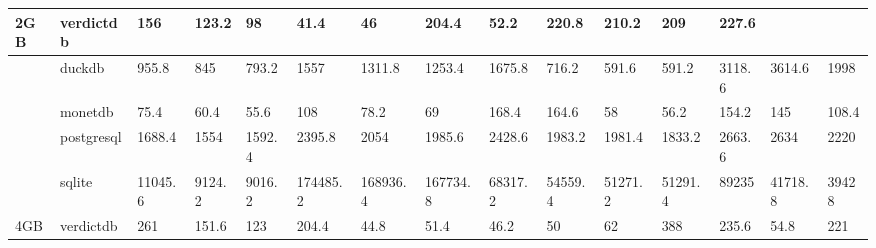 \begin{table}[]
\begin{tabular}{ll|lllllllllllll}
\multirow{-5}{*}{2GB} & verdictdb  & 156                         & 123.2                       & {\color[HTML]{009901} 98}   & {\color[HTML]{009901} 41.4} & {\color[HTML]{009901} 46}   & 204.4                       & {\color[HTML]{009901} 52.2} & 220.8                        & 210.2                       & 209                         & 227.6                       & \cellcolor[HTML]{FFFFFF}{\color[HTML]{009901} 50.8} & \cellcolor[HTML]{FFFFFF}{\color[HTML]{009901} 66.2} \\ \hline
                      & duckdb     & 955.8                       & 845                         & 793.2                       & 1557                        & 1311.8                      & 1253.4                      & 1675.8                      & 716.2                        & 591.6                       & 591.2                       & 3118.6                      & 3614.6                                              & 1998                                                \\
                      & monetdb    & {\color[HTML]{009901} 75.4} & {\color[HTML]{009901} 60.4} & {\color[HTML]{009901} 55.6} & 108                         & {\color[HTML]{009901} 78.2} & {\color[HTML]{009901} 69}   & 168.4                       & 164.6                        & {\color[HTML]{009901} 58}   & {\color[HTML]{009901} 56.2} & 154.2                       & 145                                                 & 108.4                                               \\
                      & postgresql & 1688.4                      & 1554                        & 1592.4                      & 2395.8                      & 2054                        & 1985.6                      & 2428.6                      & 1983.2                       & 1981.4                      & 1833.2                      & 2663.6                      & 2634                                                & 2220                                                \\
                      & sqlite     & 11045.6                     & 9124.2                      & 9016.2                      & 174485.2                    & 168936.4                    & 167734.8                    & 68317.2                     & 54559.4                      & 51271.2                     & 51291.4                     & 89235                       & 41718.8                                             & 39428                                               \\
\multirow{-5}{*}{4GB} & verdictdb  & 261                         & 151.6                       & 123                         & 204.4                       & {\color[HTML]{009901} 44.8} & {\color[HTML]{009901} 51.4} & {\color[HTML]{009901} 46.2} & {\color[HTML]{009901} 50}    & {\color[HTML]{009901} 62}   & 388                         & 235.6                       & {\color[HTML]{009901} 54.8}                         & 221                                                 \\ \hline

\end{tabular}
\end{table}
